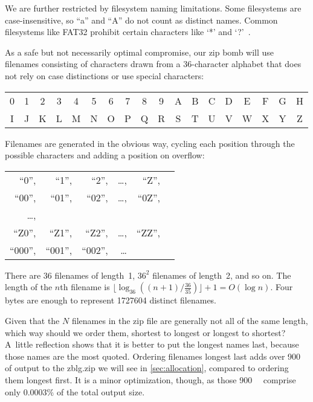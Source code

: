 \documentclass[letterpaper,twocolumn,10pt]{article}
\newcommand{\MB}{\mega\byte}
\begin{document}
We are further restricted by filesystem naming limitations.
Some filesystems are case-insensitive, so ``a'' and ``A'' do not count as distinct names.
Common filesystems like FAT32 prohibit certain characters like
`*' and `?'~\cite[\S Limits]{wiki-fs}.

As a safe but not necessarily optimal compromise,
our zip bomb will use filenames consisting of characters
drawn from a 36-character alphabet
that does not
rely on case distinctions
or use special characters:

\begin{center}
\setlength{\tabcolsep}{2pt}
\begin{tabular}{cccccccccccccccccc}
0 & 1 & 2 & 3 & 4 & 5 & 6 & 7 & 8 & 9 & A & B & C & D & E & F & G & H \\
I & J & K & L & M & N & O & P & Q & R & S & T & U & V & W & X & Y & Z
\end{tabular}
\end{center}

\noindent
Filenames are generated in the obvious way,
cycling each position through the possible characters
and adding a position on overflow:

\begin{center}
\setlength{\tabcolsep}{2pt}
\begin{tabular}{rrrrrl}
``\mbox{0}'', &
``\mbox{1}'', &
``\mbox{2}'', &
\ldots, &
``\mbox{Z}'',
\\
``\mbox{00}'', &
``\mbox{01}'', &
``\mbox{02}'', &
\ldots, &
``\mbox{0Z}'',
\\
\ldots,
\\
``\mbox{Z0}'', &
``\mbox{Z1}'', &
``\mbox{Z2}'', &
\ldots, &
``\mbox{ZZ}'',
\\
``\mbox{000}'', &
``\mbox{001}'', &
``\mbox{002}'', &
\ldots
\end{tabular}
\end{center}

\noindent
There are $36$ filenames of length~\num{1},
$36^2$ filenames of length~\num{2}, and so on.
The length of the $n$\/th filename is
$\lfloor \log_{36}((n + 1) / \frac{36}{35})\rfloor + 1 = O(\log n)$.
Four bytes are enough to represent
\num{1727604} distinct filenames.


Given that the $N$ filenames in the zip file
are generally not all of the same length,
which way should we order them,
shortest to longest or longest to shortest?
A~little reflection shows that it is better to
put the longest names last, because those names are the most quoted.
Ordering filenames longest last
adds over \SI{900}{\MB} of output
to the \mbox{zblg.zip} we will see in \autoref{sec:allocation},
compared to ordering them longest first.
It is a minor optimization, though,
as those \SI{900}{\MB} comprise only \num{0.0003}\%
of the total output size.
\end{document}
